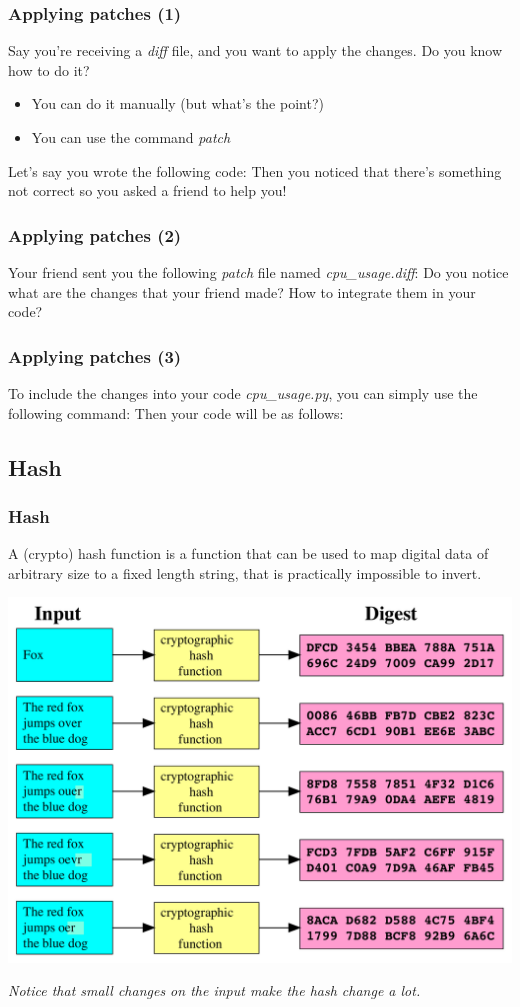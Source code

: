 \begin{frame}
  \frametitle{Applying patches (1)}

  Say you're receiving a \textit{diff} file, and you want to apply the changes. Do you know how to do it?
  \begin{itemize}
    \item You can do it manually (but what's the point?)
    \item You can use the command \textit{patch}
  \end{itemize}
  Let's say you wrote the following code:
  Then you noticed that there's something not correct so you asked a friend to help you!
\end{frame}

\begin{frame}
  \frametitle{Applying patches (2)}

  Your friend sent you the following \textit{patch} file named \textit{cpu\_usage.diff}:
  Do you notice what are the changes that your friend made? How to integrate them in your code?
\end{frame}

\begin{frame}
  \frametitle{Applying patches (3)}

  To include the changes into your code \textit{cpu\_usage.py}, you can simply use the following command:
  Then your code will be as follows:
\end{frame}

\subsection{Hash}
\begin{frame}
  \frametitle{Hash}

  A (crypto) hash function is a function that can be used to map digital data
  of arbitrary size to a fixed length string, that is practically impossible to
  invert.

  \begin{center}
    \includegraphics[width=0.6\linewidth]{figures/git-hash}
  \end{center}

  \vspace{1em}

  \textit{Notice that small changes on the input make the hash change a lot.}

\end{frame}


